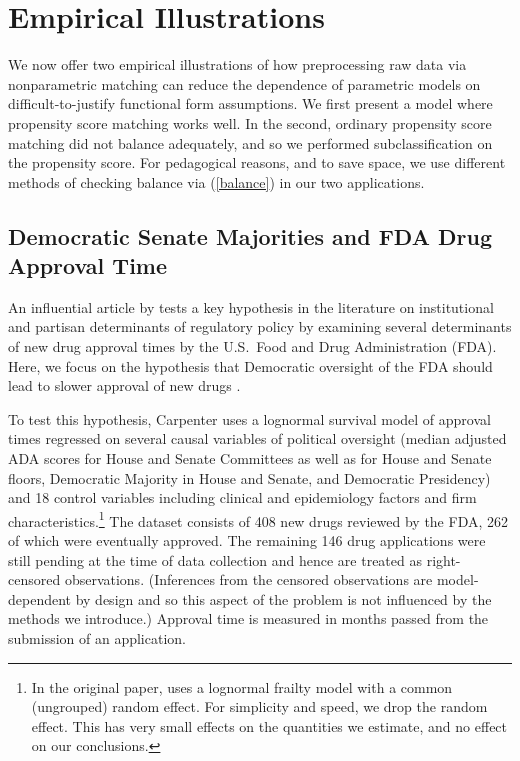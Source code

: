 \documentclass[11pt,titlepage]{article}
\begin{document}
\section{Empirical Illustrations}

We now offer two empirical illustrations of how preprocessing raw data
via nonparametric matching can reduce the dependence of parametric
models on difficult-to-justify functional form assumptions.  We first
present a model where propensity score matching works well.  In the
second, ordinary propensity score matching did not balance adequately,
and so we performed subclassification on the propensity score.  For
pedagogical reasons, and to save space, we use different methods of
checking balance via (\ref{balance}) in our two applications.

\subsection{Democratic Senate Majorities and FDA Drug Approval Time}

An influential article by \citet{Carp02} tests a key hypothesis in the
literature on institutional and partisan determinants of regulatory
policy by examining several determinants of new drug approval times by
the U.S.\ Food and Drug Administration (FDA).  Here, we focus on the
hypothesis that Democratic oversight of the FDA should lead to slower
approval of new drugs \citep[p.495 and Model 1 of Table 2,
p.499]{Carp02}.

To test this hypothesis, Carpenter uses a lognormal survival model of
approval times regressed on several causal variables of political
oversight (median adjusted ADA scores for House and Senate Committees
as well as for House and Senate floors, Democratic Majority in House
and Senate, and Democratic Presidency) and 18 control variables
including clinical and epidemiology factors and firm
characteristics.\footnote{In the original paper, \citet{Carp02} uses a
  lognormal frailty model with a common (ungrouped) random effect.
  For simplicity and speed, we drop the random effect.  This has very
  small effects on the quantities we estimate, and no effect on our
  conclusions.}  The dataset consists of 408 new drugs reviewed by the
FDA, 262 of which were eventually approved.  The remaining 146 drug
applications were still pending at the time of data collection and
hence are treated as right-censored observations.  (Inferences from
the censored observations are model-dependent by design and so this
aspect of the problem is not influenced by the methods we introduce.)
Approval time is measured in months passed from the submission of an
application.
\end{document}
